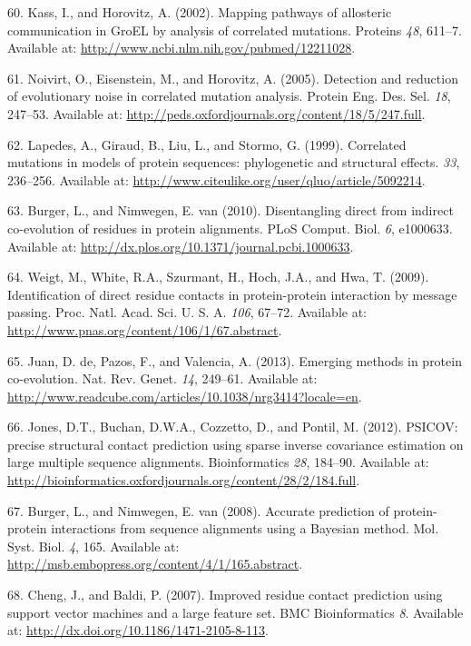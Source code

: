 \documentclass[11pt,a4paper,twoside]{book}
\theoremstyle{definition}
\theoremstyle{definition}
\theoremstyle{remark}
\begin{document}
\hypertarget{ref-Kass2002}{}
60. Kass, I., and Horovitz, A. (2002). Mapping pathways of allosteric
communication in GroEL by analysis of correlated mutations. Proteins
\emph{48}, 611--7. Available at:
\url{http://www.ncbi.nlm.nih.gov/pubmed/12211028}.

\hypertarget{ref-Noivirt2005}{}
61. Noivirt, O., Eisenstein, M., and Horovitz, A. (2005). Detection and
reduction of evolutionary noise in correlated mutation analysis. Protein
Eng. Des. Sel. \emph{18}, 247--53. Available at:
\url{http://peds.oxfordjournals.org/content/18/5/247.full}.

\hypertarget{ref-Lapedes1999}{}
62. Lapedes, A., Giraud, B., Liu, L., and Stormo, G. (1999). Correlated
mutations in models of protein sequences: phylogenetic and structural
effects. \emph{33}, 236--256. Available at:
\url{http://www.citeulike.org/user/qluo/article/5092214}.

\hypertarget{ref-Burger2010}{}
63. Burger, L., and Nimwegen, E. van (2010). Disentangling direct from
indirect co-evolution of residues in protein alignments. PLoS Comput.
Biol. \emph{6}, e1000633. Available at:
\url{http://dx.plos.org/10.1371/journal.pcbi.1000633}.

\hypertarget{ref-Weigt2009}{}
64. Weigt, M., White, R.A., Szurmant, H., Hoch, J.A., and Hwa, T.
(2009). Identification of direct residue contacts in protein-protein
interaction by message passing. Proc. Natl. Acad. Sci. U. S. A.
\emph{106}, 67--72. Available at:
\url{http://www.pnas.org/content/106/1/67.abstract}.

\hypertarget{ref-DeJuan2013}{}
65. Juan, D. de, Pazos, F., and Valencia, A. (2013). Emerging methods in
protein co-evolution. Nat. Rev. Genet. \emph{14}, 249--61. Available at:
\url{http://www.readcube.com/articles/10.1038/nrg3414?locale=en}.

\hypertarget{ref-Jones2012}{}
66. Jones, D.T., Buchan, D.W.A., Cozzetto, D., and Pontil, M. (2012).
PSICOV: precise structural contact prediction using sparse inverse
covariance estimation on large multiple sequence alignments.
Bioinformatics \emph{28}, 184--90. Available at:
\url{http://bioinformatics.oxfordjournals.org/content/28/2/184.full}.

\hypertarget{ref-Burger2008}{}
67. Burger, L., and Nimwegen, E. van (2008). Accurate prediction of
protein-protein interactions from sequence alignments using a Bayesian
method. Mol. Syst. Biol. \emph{4}, 165. Available at:
\url{http://msb.embopress.org/content/4/1/165.abstract}.

\hypertarget{ref-Cheng2007}{}
68. Cheng, J., and Baldi, P. (2007). Improved residue contact prediction
using support vector machines and a large feature set. BMC
Bioinformatics \emph{8}. Available at:
\url{http://dx.doi.org/10.1186/1471-2105-8-113}.
\end{document}
